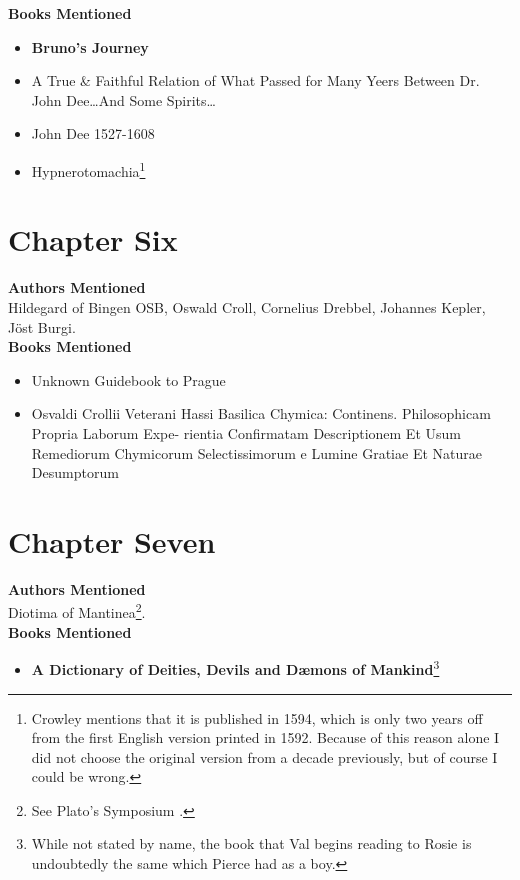 \documentclass[12pt,makeidx]{extreport}
\begin{document}
\hspace{-1.5em}\textbf{Books Mentioned}
\begin{itemize}
\item \textbf{Bruno’s Journey} \parencite{Craft1931}
\item A True \& Faithful Relation of What Passed for Many Yeers Between Dr. John Dee\ldots And Some
Spirits\ldots \parencite{Dee1659}
\item John Dee 1527-1608 \parencite{Smith1909}
\item Hypnerotomachia\footnote{Crowley mentions that it is published in 1594, which is only two years off from the first English version printed in 1592. Because of this reason alone I did not choose the original version from a decade previously, but of course I could be wrong.} \parencite{Colonna1592}
\end{itemize}

\section{Chapter Six}
\textbf{Authors Mentioned}\\
Hildegard of Bingen OSB, Oswald Croll, Cornelius Drebbel, Johannes Kepler, Jöst Burgi.
\\

\hspace{-1.5em}\textbf{Books Mentioned}
\begin{itemize}
\item Unknown Guidebook to Prague \parencite{UnknownPre1967}
\item Osvaldi Crollii Veterani Hassi Basilica Chymica: Continens. Philosophicam Propria Laborum Expe-
rientia Confirmatam Descriptionem Et Usum Remediorum Chymicorum Selectissimorum e Lumine
Gratiae Et Naturae Desumptorum \parencite{Croll1611}
\end{itemize}

\section{Chapter Seven}
\textbf{Authors Mentioned}\\
Diotima of Mantinea\footnote{See Plato’s Symposium \parencite{Plato1925}.}.
\\

\hspace{-1.5em}\textbf{Books Mentioned}
\begin{itemize}
\item \textbf{A Dictionary of Deities, Devils and Dæmons of Mankind}\footnote{While not stated by name, the book that Val begins reading to Rosie is undoubtedly the same which Pierce had as a boy.} \parencite{St.Phalle}
\end{itemize}
\end{document}
